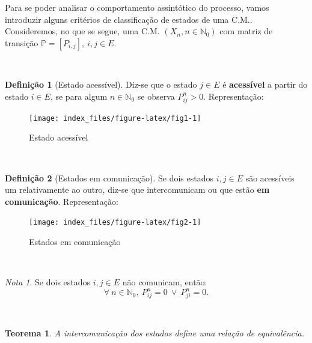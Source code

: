\documentclass[
  11pt,
  a4paper,
]{book}
\newtheorem{theorem}{Teorema}[chapter]
\theoremstyle{definition}
\newtheorem{definition}{Definição}[chapter]
\theoremstyle{definition}
\theoremstyle{definition}
\theoremstyle{definition}
\theoremstyle{remark}
\newtheorem*{remark}{Nota }
\begin{document}
Para se poder analisar o comportamento assintótico do processo, vamos introduzir alguns critérios de classificação de estados de uma C.M.. Consideremos, no que se segue, uma C.M. \((X_n, n \in \mathbb{N}_0)\) com matriz de transição \(\mathbb{P}=[P_{i,j}], ~i,j \in E\).

\(\,\)

\begin{definition}[Estado acessível]

Diz-se que o estado \(j \in E\) é \textbf{acessível} a partir do estado \(i \in E\), se para algum \(n \in \mathbb{N}_0\) se observa \(P_{ij}^n>0\). Representação:

\begin{figure}

{\centering \texttt{[image: index\_files/figure-latex/fig1-1]} 

}

\caption{Estado acessível}\label{fig:fig1}
\end{figure}

\end{definition}

\(\,\)

\begin{definition}[Estados em comunicação]

Se dois estados \(i,j \in E\) são acessíveis um relativamente ao outro, diz-se que intercomunicam ou que estão \textbf{em comunicação}. Representação:

\begin{figure}

{\centering \texttt{[image: index\_files/figure-latex/fig2-1]} 

}

\caption{Estados em comunicação}\label{fig:fig2}
\end{figure}

\end{definition}

\(\,\)

\begin{remark}
Se dois estados \(i,j \in E\) não comunicam, então:
\[\forall ~n \in \mathbb{N}_0, ~P_{ij}^n=0 ~\vee ~ P_{ji}^n=0.\]
\end{remark}

\(\,\)

\begin{theorem}
A intercomunicação dos estados define uma relação de equivalência.
\end{theorem}

\(\,\)
\end{document}
